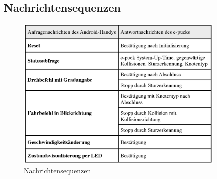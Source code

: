 \documentclass[10pt,a4paper]{article}
\begin{document}
		\subsection{Nachrichtensequenzen}	
		 	\begin{figure}[h]
				\centering
				\includegraphics[width=10cm]{images/epuck_bt_msgs.eps}
  				\caption{Nachrichtensequenzen}
  				\label{fig:nachrichtensequenzen}
  			\end{figure}					
	\newpage	
	\printglossary[style=altlist,title=Glossar]
						
\end{document}
